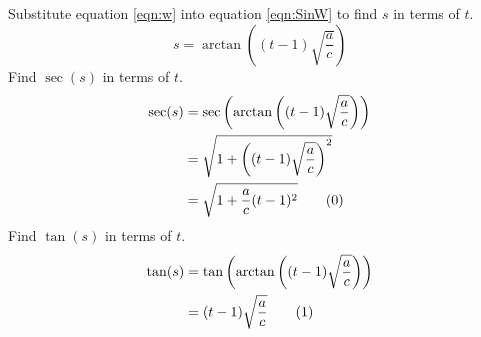 \documentclass{article}
\begin{document}
Substitute equation \ref{eqn:w} into equation \ref{eqn:SinW} to find $s$ in terms of $t$.
\begin{equation*}
    s=\arctan\left((t-1)\sqrt{\frac{a}{c}}\right)
\end{equation*}
Find $\sec(s)$ in terms of $t$.
\begin{align*}
    \sec(s) &= \sec\left(\arctan\left((t-1)\sqrt{\frac{a}{c}}\right)\right)\\
    &= \sqrt{1+\left((t-1)\sqrt{\frac{a}{c}}\right)^2}\\
    &= \sqrt{1+\frac{a}{c}(t-1)^2}\tag{\theequation}\label{eqn:secs}
    \stepcounter{equation}
\end{align*}
Find $\tan(s)$ in terms of $t$.
\begin{align*}
    \tan(s) &= \tan\left(\arctan\left((t-1)\sqrt{\frac{a}{c}}\right)\right)\\
    &= (t-1)\sqrt{\frac{a}{c}}\tag{\theequation}\label{eqn:tans}
    \stepcounter{equation}
\end{align*}
\end{document}
